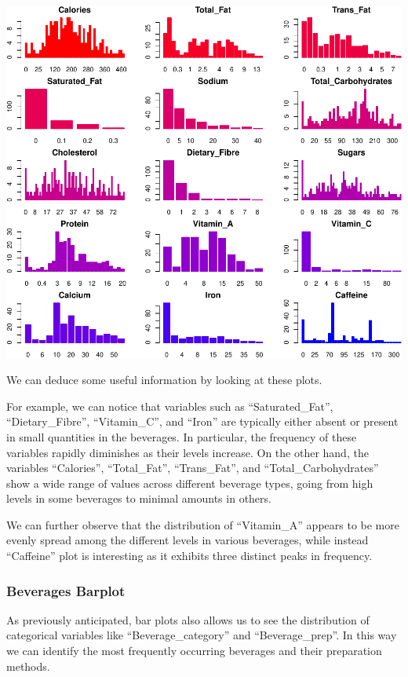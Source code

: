 \documentclass[
]{article}
\begin{document}
\begin{center}\includegraphics{Statistical_Learning_Final_Report_files/figure-latex/barplot-1} \end{center}

We can deduce some useful information by looking at these plots.

For example, we can notice that variables such as ``Saturated\_Fat'',
``Dietary\_Fibre'', ``Vitamin\_C'', and ``Iron'' are typically either
absent or present in small quantities in the beverages. In particular,
the frequency of these variables rapidly diminishes as their levels
increase. On the other hand, the variables ``Calories'', ``Total\_Fat'',
``Trans\_Fat'', and ``Total\_Carbohydrates'' show a wide range of values
across different beverage types, going from high levels in some
beverages to minimal amounts in others.

We can further observe that the distribution of ``Vitamin\_A'' appears
to be more evenly spread among the different levels in various
beverages, while instead ``Caffeine'' plot is interesting as it exhibits
three distinct peaks in frequency.

\subsubsection{Beverages Barplot}\label{beverages-barplot}

As previously anticipated, bar plots also allows us to see the
distribution of categorical variables like ``Beverage\_category'' and
``Beverage\_prep''. In this way we can identify the most frequently
occurring beverages and their preparation methods.
\end{document}
